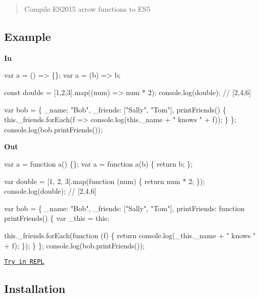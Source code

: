 \begin{quote}
Compile E\+S2015 arrow functions to E\+S5 \end{quote}


\subsection*{Example}

{\bfseries In}


\begin{DoxyCode}
var a = () => \{\};
var a = (b) => b;

const double = [1,2,3].map((num) => num * 2);
console.log(double); // [2,4,6]

var bob = \{
  \_name: "Bob",
  \_friends: ["Sally", "Tom"],
  printFriends() \{
    this.\_friends.forEach(f =>
      console.log(this.\_name + " knows " + f));
  \}
\};
console.log(bob.printFriends());
\end{DoxyCode}


{\bfseries Out}


\begin{DoxyCode}
var a = function a() \{\};
var a = function a(b) \{
  return b;
\};

var double = [1, 2, 3].map(function (num) \{
  return num * 2;
\});
console.log(double); // [2,4,6]

var bob = \{
  \_name: "Bob",
  \_friends: ["Sally", "Tom"],
  printFriends: function printFriends() \{
    var \_this = this;

    this.\_friends.forEach(function (f) \{
      return console.log(\_this.\_name + " knows " + f);
    \});
  \}
\};
console.log(bob.printFriends());
\end{DoxyCode}


\href{http://babeljs.io/repl/#?evaluate=true&lineWrap=true&presets=es2015%2Ces2015-loose&experimental=false&loose=false&spec=false&code=var%20a%20%3D%20()%20%3D%3E%20%7B%7D%3B%0Avar%20a%20%3D%20(b)%20%3D%3E%20b%3B%0A%0Aconst%20double%20%3D%20%5B1%2C2%2C3%5D.map((num)%20%3D%3E%20num%20*%202)%3B%0Aconsole.log(double)%3B%20%2F%2F%20%5B2%2C4%2C6%5D%0A%0Avar%20bob%20%3D%20%7B%0A%20%20_name%3A%20%22Bob%22%2C%0A%20%20_friends%3A%20%5B%22Sally%22%2C%20%22Tom%22%5D%2C%0A%20%20printFriends()%20%7B%0A%20%20%20%20this._friends.forEach(f%20%3D%3E%0A%20%20%20%20%20%20console.log(this._name%20%2B%20%22%20knows%20%22%20%2B%20f))%3B%0A%20%20%7D%0A%7D%3B%0Aconsole.log(bob.printFriends())%3B&playground=true}{\tt Try in R\+E\+PL}

\subsection*{Installation}


